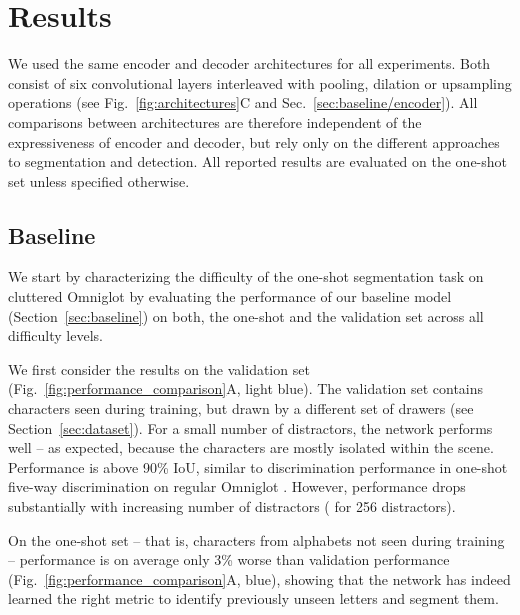 \documentclass{article}
\begin{document}
\section{Results}
\label{sec:results}

We used the same encoder and decoder architectures for all experiments.
Both consist of six convolutional layers interleaved with pooling, dilation or upsampling operations (see Fig.~\ref{fig:architectures}C and Sec.~\ref{sec:baseline/encoder}).
All comparisons between architectures are therefore independent of the expressiveness of encoder and decoder, but rely only on the different approaches to segmentation and detection.
All reported results are evaluated on the one-shot set unless specified otherwise.





\subsection{Baseline}
\label{sec:results/baseline}

We start by characterizing the difficulty of the one-shot segmentation task on cluttered Omniglot by evaluating the performance of our baseline model (Section~\ref{sec:baseline}) on both, the one-shot and the validation set across all difficulty levels.


We first consider the results on the validation set (Fig.~\ref{fig:performance_comparison}A, light blue). 
The validation set contains characters seen during training, but drawn by a different set of drawers (see Section~\ref{sec:dataset}).
For a small number of distractors, the network performs well -- as expected, because the characters are mostly isolated within the scene. Performance is above 90\% IoU, similar to discrimination performance in one-shot five-way discrimination on regular Omniglot \cite{Koch2015a, Vinyals2016, Snell2017, Triantafillou2017a, Shyam2017}.
However, performance drops substantially with increasing number of distractors ( for 256 distractors).

On the one-shot set -- that is, characters from alphabets not seen during training --  performance is on average only 3\% worse than validation performance (Fig.~\ref{fig:performance_comparison}A, blue), showing that the network has indeed learned the right metric to identify previously unseen letters and segment them.
\end{document}
